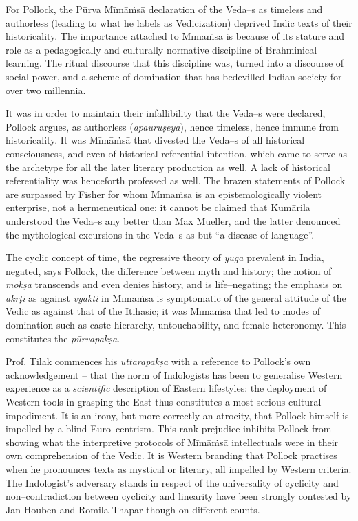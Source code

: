 For Pollock, the Pūrva Mīmāṁsā declaration of the Veda–s as timeless and authorless (leading to what he labels as Vedicization) deprived Indic texts of their historicality. The importance attached to Mīmāṁsā is because of its stature and role as a pedagogically and culturally normative discipline of Brahminical learning. The ritual discourse that this discipline was, turned into a discourse of social power, and a scheme of domination that has bedevilled Indian society for over two millennia. 

It was in order to maintain their infallibility that the Veda–s were declared, Pollock argues, as authorless (\textit{apauruṣeya}), hence timeless, hence immune from historicality. It was Mīmāṁsā that divested the Veda–s of all historical consciousness, and even of historical referential intention, which came to serve as the archetype for all the later literary production as well. A lack of historical referentiality was henceforth professed as well. The brazen statements of Pollock are surpassed by Fisher for whom Mīmāṁsā is an epistemologically violent enterprise, not a hermeneutical one: it cannot be claimed that Kumārila understood the Veda–s any better than Max Mueller, and the latter denounced the mythological excursions in the Veda–s as but “a disease of language”. 

The cyclic concept of time, the regressive theory of \textit{yuga} prevalent in India, negated, says Pollock, the difference between myth and history; the notion of \textit{mokṣa} transcends and even denies history, and is life–negating; the emphasis on \textit{ākrṭi} as against \textit{vyakti} in Mīmāṁsā is symptomatic of the general attitude of the Vedic as against that of the Itihāsic; it was Mīmāṁsā that led to modes of domination such as caste hierarchy, untouchability, and female heteronomy. This constitutes the \textit{pūrvapakṣa}.

 Prof. Tilak commences his \textit{uttarapakṣa} with a reference to Pollock’s own acknowledgement – that the norm of Indologists has been to generalise Western experience as a \textit{scientific} description of Eastern lifestyles: the deployment of Western tools in grasping the East thus constitutes a most serious cultural impediment. It is an irony, but more correctly an atrocity, that Pollock himself is impelled by a blind Euro–centrism. This rank prejudice inhibits Pollock from showing what the interpretive protocols of Mīmāṁsā intellectuals were in their own comprehension of the Vedic. It is Western branding that Pollock practises when he pronounces texts as mystical or literary, all impelled by Western criteria. The Indologist’s adversary stands in respect of the universality of cyclicity and non–contradiction between cyclicity and linearity have been strongly contested by Jan Houben and Romila Thapar though on different counts. 

